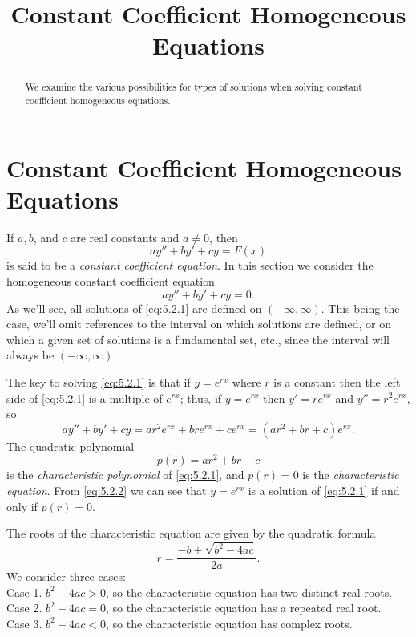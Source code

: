 \documentclass{ximera}
\title{Constant Coefficient Homogeneous Equations}
\begin{document}
 
\begin{abstract}
We examine the various possibilities for types of solutions when solving constant coefficient homogeneous equations.
\end{abstract}
 
\maketitle
 
\section*{Constant Coefficient Homogeneous Equations}
 
If $a,b$, and $c$ are real constants and $a\neq 0$, then
$$
ay''+by'+cy=F(x)
$$
 is said to be a \textit{constant coefficient
 equation}.
In this section we  consider the homogeneous constant
coefficient equation
\begin{equation} \label{eq:5.2.1}
ay''+by'+cy=0.
\end{equation}
As we'll see, all solutions of \eqref{eq:5.2.1} are defined on
$(-\infty,\infty)$.  This being the case, we'll omit references to the
interval on which solutions are defined, or on which a given set of
solutions is a fundamental set, etc., since the interval will always
be $(-\infty,\infty)$.
 
The key to solving \eqref{eq:5.2.1} is  that if
 $y=e^{rx}$ where $r$ is a constant  then the left side of
\eqref{eq:5.2.1} is a  multiple of $e^{rx}$;   thus, if $y=e^{rx}$
 then $y'=re^{rx}$ and $y''=r^2e^{rx}$, so
\begin{equation} \label{eq:5.2.2}
ay''+by'+cy=ar^2e^{rx}+bre^{rx}+ce^{rx}=(ar^2+br+c)e^{rx}.
\end{equation}
The quadratic polynomial
$$
p(r)=ar^2+br+c
$$
is  the \textit{characteristic polynomial} of \eqref{eq:5.2.1}, and
$p(r)=0$
is the \textit{characteristic equation}.
From \eqref{eq:5.2.2} we can see that $y=e^{rx}$ is a solution of
\eqref{eq:5.2.1}  if and only if $p(r)=0$.
 
The roots of the characteristic equation are given by the quadratic
formula
\begin{equation} \label{eq:5.2.3}
r=\frac{-b\pm\sqrt{b^2-4ac}}{2a}.
\end{equation}
We consider three cases:\\
Case 1. $b^2-4ac>0$, so the characteristic equation has two
distinct real roots.\\
Case 2. $b^2-4ac=0$, so the characteristic equation has a
repeated real root.\\
Case 3. $b^2-4ac<0$, so the characteristic equation has
complex roots.
 
\end{document}
